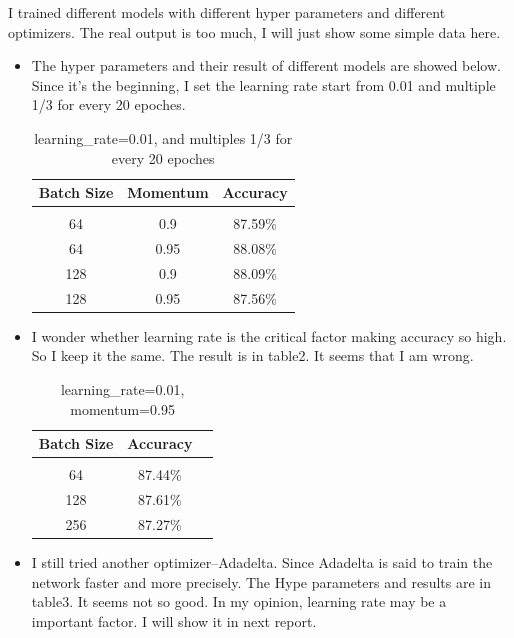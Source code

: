 \documentclass{article} %
\begin{document}
I trained different models with different hyper parameters and different optimizers. The real output is too much, I will just show some simple data here.

\begin{itemize}
\item The hyper parameters and their result of different models are showed below. Since it's the beginning, I set the learning rate start from 0.01 and multiple 1/3 for every 20 epoches.

\begin{table}[h]
\caption{learning\_rate=0.01, and multiples 1/3 for every 20 epoches}
\begin{center}
\begin{tabular}{c|c|c}
\multicolumn{1}{c}{\bf Batch Size} &\multicolumn{1}{c}{\bf Momentum} &\multicolumn{1}{c}{\bf Accuracy}
\\ \hline \\
64 & 0.9 & 87.59\% \\
64 & 0.95 & 88.08\%\\
128 & 0.9 & 88.09\%\\
128 & 0.95 & 87.56\%\\
\end{tabular}
\end{center}
\end{table}

\item I wonder whether learning rate is the critical factor making accuracy so high. So I keep it the same. The result is in table2. It seems that I am wrong.

\begin{table}[h]
\caption{learning\_rate=0.01, momentum=0.95}
\begin{center}
\begin{tabular}{c|c|c}
\multicolumn{1}{c}{\bf Batch Size} &\multicolumn{1}{c}{\bf Accuracy}
\\ \hline \\
64 & 87.44\% \\
128 & 87.61\% \\
256 & 87.27\% \\
\end{tabular}
\end{center}
\end{table}

\item I still tried another optimizer--Adadelta. Since Adadelta is said to train the network faster and more precisely. The Hype parameters and results are in table3. It seems not so good. In my opinion, learning rate may be a important factor. I will show it in next report.


\end{itemize}
\end{document}
